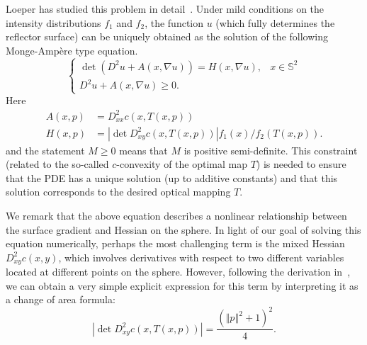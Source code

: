 \documentclass{amsart}
\newcommand{\bq}{\begin{equation}}
\newcommand{\eq}{\end{equation}}
\newcommand{\abs}[1]{\left\vert#1\right\vert}
\newcommand{\Sf}{\mathbb{S}^{2}}
\newcommand{\MA}{Monge-Amp\`ere\xspace}
\theoremstyle{lemma}
\theoremstyle{remark}
\begin{document}
Loeper has studied this problem in detail~\cite{Loeper_OTonSphere}. Under mild conditions on the intensity distributions $f_1$ and $f_2$, the function $u$ (which fully determines the reflector surface) can be uniquely obtained as the solution of the following \MA type equation.
\bq\label{eq:OTPDE}
\begin{cases}
\det(D^2u + A(x,\nabla u)) = H(x,\nabla u), & x \in \Sf\\
D^2u + A(x,\nabla u) \geq 0.
\end{cases}
\eq
Here
\bq\label{eq:PDETerms}
\begin{split}
A(x,p) &= D_{xx}^2c \left( x,T(x,p) \right)\\
H(x,p) &= \abs{\det{D_{xy}^2c \left( x,T(x,p) \right)}}f_1(x)/f_2 \left( T(x,p) \right).
\end{split}
\eq
and the statement $M \geq 0$ means that $M$ is positive semi-definite.  This constraint (related to the so-called $c$-convexity of the optimal map $T$) is needed to ensure that the PDE has a unique solution (up to additive constants) and that this solution corresponds to the desired optical mapping $T$. 

We remark that the above equation describes a nonlinear relationship between the surface gradient and Hessian on the sphere.  In light of our goal of solving this equation numerically, perhaps the most challenging term is the mixed Hessian $D_{xy}^2c(x,y)$, which involves derivatives with respect to two different variables located at different points on the sphere.  However, following the derivation in~\cite{HT_OTonSphere2}, we can obtain a very simple explicit expression for this term by interpreting it as a change of area formula:
\begin{equation}\label{eq:mixedHessian}
\abs{\det{D_{xy}^2c \left( x,T(x,p) \right)}} = \frac{\left(\left\Vert p \right\Vert^2 + 1 \right)^2}{4}.
\end{equation}

\end{document}
